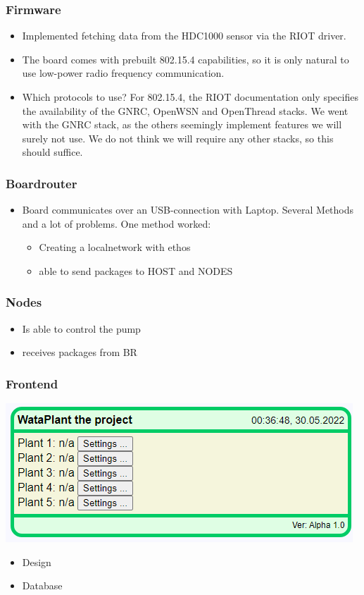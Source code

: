 \documentclass[10pt, xcolor=svgnames]{beamer}
\begin{document}
\begin{frame}
    \frametitle{Firmware}

    \begin{itemize}
        \item Implemented fetching data from the HDC1000 sensor via the RIOT driver.
        \item The board comes with prebuilt 802.15.4 capabilities, so it is only natural to use low-power radio frequency communication.
        \item Which protocols to use? For 802.15.4, the RIOT documentation only specifies the availability of the GNRC, OpenWSN and OpenThread stacks. We went with the GNRC stack, as the others seemingly implement features we will surely not use. We do not think we will require any other stacks, so this should suffice.
    \end{itemize}
\end{frame}

\begin{frame}
    \frametitle{Boardrouter}

    \begin{itemize}
        \item Board communicates over an USB-connection with Laptop. Several Methods and a lot of problems. One method worked:
        \begin{itemize}
            \item Creating a localnetwork with ethos
            \item able to send packages to HOST and NODES
        \end{itemize}
    \end{itemize}
\end{frame}

\begin{frame}
    \frametitle{Nodes}

    \begin{itemize}
        \item Is able to control the pump
        \item receives packages from BR
    \end{itemize}
\end{frame}

\begin{frame}
    \frametitle{Frontend}
    \includegraphics[scale=0.8]{Frontend.png}
    \begin{itemize}
        \item Design
        \item Database
    \end{itemize}
\end{frame}
\end{document}
